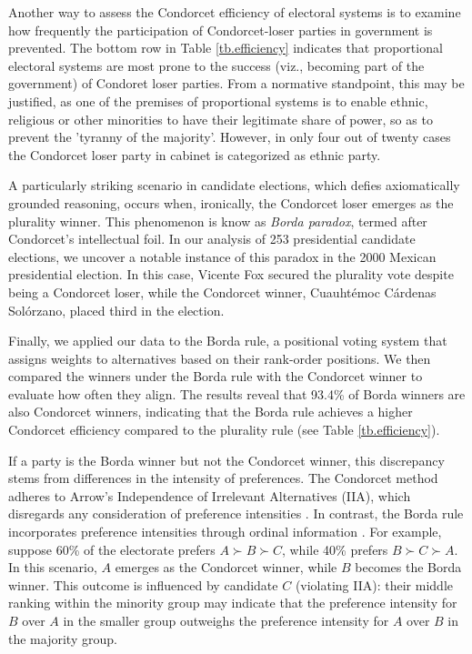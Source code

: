 \documentclass[12pt]{scrartcl}
\newcommand{\nbelections}{253 }
\begin{document}
Another way to assess the Condorcet efficiency of electoral systems is to examine how frequently the participation of Condorcet-loser parties in government is prevented. The bottom row in Table \ref{tb.efficiency} indicates that proportional electoral systems are most prone to the success (viz., becoming part of the government) of Condoret loser parties. From a normative standpoint, this may be justified, as one of the premises of proportional systems is to enable ethnic, religious or other minorities to have their legitimate share of power, so as to prevent the 'tyranny of the majority'. However, in only four out of twenty cases the Condorcet loser party in cabinet is categorized as ethnic party. 

A particularly striking scenario in candidate elections, which defies axiomatically grounded reasoning, occurs when, ironically, the Condorcet loser emerges as the plurality winner. This phenomenon is know as \textit{Borda paradox}, termed after Condorcet's intellectual foil. In our analysis of \nbelections presidential candidate elections, we uncover a notable instance of this paradox in the 2000 Mexican presidential election. In this case, Vicente Fox secured the plurality vote despite being a Condorcet loser, while the Condorcet winner, Cuauhtémoc Cárdenas Solórzano, placed third in the election.

Finally, we applied our data to the Borda rule, a positional voting system that assigns weights to alternatives based on their rank-order positions. We then compared the winners under the Borda rule with the Condorcet winner to evaluate how often they align. The results reveal that 93.4\% of Borda winners are also Condorcet winners, indicating that the Borda rule achieves a higher Condorcet efficiency compared to the plurality rule (see Table \ref{tb.efficiency}).

If a party is the Borda winner but not the Condorcet winner, this discrepancy stems from differences in the intensity of preferences. The Condorcet method adheres to Arrow's Independence of Irrelevant Alternatives (IIA), which disregards any consideration of preference intensities \citep[Ch.~7]{Sen2017}. In contrast, the Borda rule incorporates preference intensities through ordinal information \citep{Maskin2024}. For example, suppose 60\% of the electorate prefers $A \succ B \succ C$, while 40\% prefers $B \succ C \succ A$. In this scenario, $A$ emerges as the Condorcet winner, while $B$ becomes the Borda winner. This outcome is influenced by candidate $C$ (violating IIA): their middle ranking within the minority group may indicate that the preference intensity for $B$ over $A$ in the smaller group outweighs the preference intensity for $A$ over $B$ in the majority group.
\end{document}
